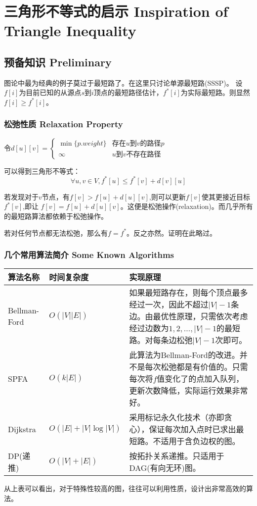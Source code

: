 \section{三角形不等式的启示 Inspiration of Triangle Inequality}
\subsection{预备知识 Preliminary}
图论中最为经典的例子莫过于最短路了。在这里只讨论单源最短路(SSSP)。
设$f[i]$为目前已知的从源点$s$到$i$顶点的最短路径估计，$f^*[i]$为实际最短路。则显然$f[i] \geq f^*[i]$。

\subsubsection{松弛性质 Relaxation Property}
\par 令$d[u][v] = \left\{ \begin{array}{ll}
	\min\{p.weight\} & \text{存在$u$到$v$的路径$p$} \\
	\infty & \text{$u$到$v$不存在路径}
	\end{array} \right.$

\par 可以得到三角形不等式：
\begin{equation} \label{eq:tri}
\forall u, v \in V, f^*[u] \leq f^*[v] + d[v][u]
\end{equation}

若发现对于$v$节点，有$f[v] > f[u] + d[u][v]$,则可以更新$f[v]$使其更接近目标$f^*[v]$,即让 $f[v] = f[u] + d[u][v]$。这便是松弛操作(relaxation)。而几乎所有的最短路算法都依赖于松弛操作。
\par 若对任何节点都无法松弛，那么有$f = f^*$。反之亦然。证明在此略过。

\subsubsection{几个常用算法简介 Some Known Algorithms}
\begin{center}
\begin{tabular}{|l|l|p{8cm}|}
\hline
算法名称 & 时间复杂度 & 实现原理 \\ \hline
Bellman-Ford & $O(|V||E|)$ & 如果最短路存在，则每个顶点最多经过一次，因此不超过$|V|-1$条边。由最优性原理，只需依次考虑经过边数为$1,2,\ldots,|V|-1$的最短路。对每条边松弛$|V|-1$次即可。\\ \hline
SPFA & $O(k|E|)$ & 此算法为Bellman-Ford的改进。并不是每次松弛都是有价值的。只需每次将$f$值变化了的点加入队列，更新次数降低，实际运行效果非常好。\\ \hline
Dijkstra & $O(|E| + |V| \log |V|)$ & 采用标记永久化技术（亦即贪心），保证每次加入点时已求出最短路。不适用于含负边权的图。\\ \hline
DP(递推) & $O(|V| + |E|)$ & 按拓扑关系递推。只适用于DAG(有向无环)图。\\
\hline
\end{tabular}
\end{center}
\par 从上表可以看出，对于特殊性较高的图，往往可以利用性质，设计出非常高效的算法。

